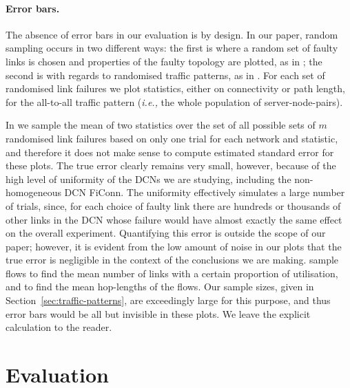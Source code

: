 \documentclass[]{amsart}
\begin{document}
{\paragraph{Error bars.} The absence of error bars in our evaluation is by design.  In our paper, random sampling occurs in two different ways: the first is where a random set of faulty links is chosen and properties of the faulty topology are plotted, as in ;
the second is with regards to randomised traffic patterns, as in
.  For
each set of randomised link failures we plot statistics, either on
connectivity or path length, for the all-to-all traffic pattern
(\emph{i.e.,} the whole population of server-node-pairs).

In
we sample the mean of two statistics over the set of all possible sets of $m$ randomised link failures based on only one trial for each network and statistic, and therefore it does not make sense to compute estimated standard error for these plots.  The true error clearly remains very small, however, because of the high level of uniformity of the DCNs we are studying, including the non-homogeneous DCN FiConn. The uniformity effectively simulates a large number of trials, since, for each choice of faulty link there are hundreds or thousands of other links in the DCN whose failure would have almost exactly the same effect on the overall experiment.  Quantifying this error is outside the scope of our paper; however, it is evident from the low amount of noise in our plots that the true error is negligible in the context of the conclusions we are making.  sample flows to find the mean number of links with a certain proportion of utilisation, and to find the mean hop-lengths of the flows.  Our sample sizes, given in Section~\ref{sec:traffic-patterns}, are exceedingly large for this purpose, and thus error bars would be all but invisible in these plots.  We leave the explicit calculation to the reader.





 
\section{Evaluation}
\label{sec:evaluation}


}
\end{document}
